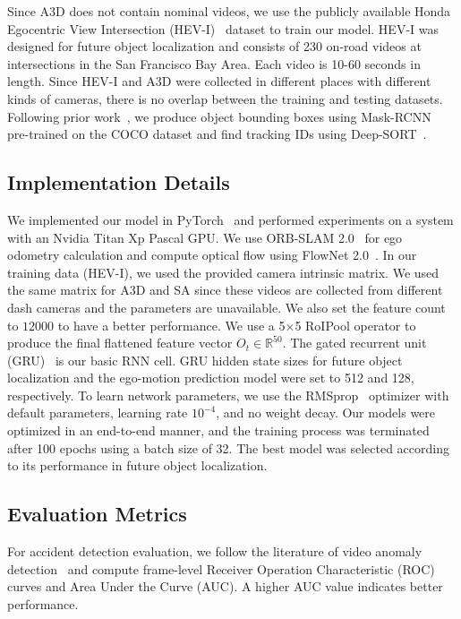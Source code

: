\documentclass[letterpaper, 10 pt, conference]{ieeeconf}
\theoremstyle{definition}
\theoremstyle{remark}
\begin{document}
Since A3D does not contain nominal videos, we use the publicly
available Honda Egocentric View Intersection
(HEV-I)~\cite{yao2018egocentric} dataset to train our model. HEV-I
was designed for future object localization and consists of 230
on-road videos at intersections in the San Francisco Bay Area. Each video 
is 10-60 seconds in length. Since HEV-I and A3D
were collected in different places with different kinds of cameras,
there is no overlap between the training and testing datasets.
Following prior work~\cite{yao2018egocentric}, we produce object
bounding boxes using Mask-RCNN~\cite{he2017mask} pre-trained on the
COCO dataset and find tracking IDs using
Deep-SORT~\cite{wojke2017simple}.

\subsection{Implementation Details}
We implemented our model in PyTorch~\cite{pytorch} and performed experiments 
on a system with an Nvidia Titan Xp Pascal
GPU. We use ORB-SLAM 2.0~\cite{mur2017orb} for ego
odometry calculation and compute optical flow using FlowNet
2.0~\cite{ilg2017flownet}. In our training data (HEV-I), 
we used the provided camera intrinsic matrix. We used the same matrix 
for A3D and SA
since these videos are collected from different dash cameras and the 
parameters are unavailable. We also set the feature count to $12000$ to 
have a better performance.
We use a 5$\times$5 RoIPool operator to
produce the final flattened feature vector $O_t \in
\mathbb{R}^{50}$. The gated recurrent unit
(GRU)~\cite{chung2015gated} is our basic RNN cell. GRU hidden state sizes 
for future object localization  and the ego-motion prediction model were
set to 512 and 128, respectively. To learn network parameters, we
use the RMSprop~\cite{hinton2012neural} optimizer with default
parameters, learning rate $10^{-4}$, and no weight decay. Our models
were optimized in an end-to-end manner, and the training process was
terminated after 100 epochs using a batch size of 32. The best model
was selected according to its performance in future object localization.

\subsection{Evaluation Metrics}

For accident detection evaluation, we follow the literature of video anomaly 
detection~\cite{li2014anomaly}
and compute frame-level Receiver Operation Characteristic (ROC) curves and Area
Under the Curve (AUC). A higher AUC value indicates better
performance.
\end{document}
